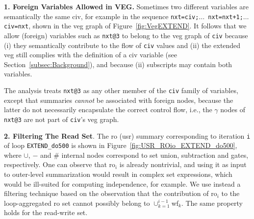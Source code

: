 \documentclass{sig-alternate}
\begin{document}
{\bf 1. Foreign Variables Allowed in VEG.}
%
Sometimes two different variables are semantically the same {\sc civ},
for example in the sequence {\tt nxt=civ;$\ldots$ nxt=nxt+1;$\ldots$ civ=nxt},
shown in the {\sc veg} graph of Figure~\ref{fig:VegEXTEND}. 
It follows that we allow (foreign) variables such as {\tt nxt@3} to belong to
the {\sc veg} graph of {\tt civ} because (i) they semantically contribute to 
the flow of {\tt civ} values and (ii) the extended {\sc veg} still complies 
with the definition of a {\sc civ} variable (see Section~\ref{subsec:Background}), 
and because (ii) subscripts may contain both variables.  

%
The analysis treats {\tt nxt@3} as any other member of the {\tt civ} family of 
variables, except that summaries {\em cannot} be associated with foreign nodes,
because the latter do not necessarily encapsulate the correct control flow,
i.e., the $\gamma$ nodes of {\tt nxt@3} are not part of {\tt civ}'s {\sc veg} graph.

\vspace{1ex}

{\bf 2. Filtering The Read Set}. The {\sc ro} ({\sc usr}) summary corresponding 
to iteration {\tt i} of loop {\tt EXTEND\_do500} is shown in 
Figure~\ref{fig:USR_ROio_EXTEND_do500}, where $\cup$, $-$ and $\#$ internal nodes 
correspond to set union, subtraction and gates, respectively.   
One can observe that {\sc ro}$_{i}$ is already nontrivial, and using it as
input to outer-level summarization would result in complex set expressions,
which would be ill-suited for computing independence, for example.
%
%
We use instead a filtering technique based on the observation that
the contribution of {\sc ro}$_i$ to the loop-aggregated
{\sc ro} set cannot possibly belong to $\cup_{k=1}^{i-1}${\sc wf}$_k$.
The same property holds for the read-write set.
\end{document}
